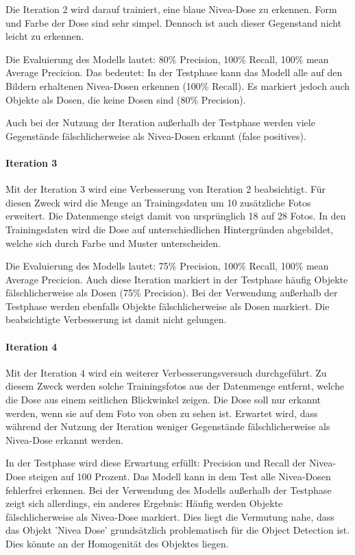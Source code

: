Die Iteration 2 wird darauf trainiert, eine blaue Nivea-Dose zu erkennen. Form und Farbe der Dose sind sehr simpel. Dennoch ist auch dieser Gegenstand nicht leicht zu erkennen. 

Die Evaluierung des Modells lautet: 80\% Precision, 100\% Recall, 100\% mean Average Precicion.
Das bedeutet: In der Testphase kann das Modell alle auf den Bildern erhaltenen Nivea-Dosen erkennen (100\% Recall). Es markiert jedoch auch Objekte als Dosen, die keine Dosen sind (80\% Precision).

Auch bei der Nutzung der Iteration außerhalb der Testphase werden viele Gegenstände fälschlicherweise als Nivea-Dosen erkannt (false positives). 


\paragraph{Iteration 3}

Mit der Iteration 3 wird eine Verbesserung von Iteration 2 beabsichtigt. Für diesen Zweck wird die Menge an Trainingsdaten um 10 zusätzliche Fotos erweitert. Die Datenmenge steigt damit von ursprünglich 18 auf 28 Fotos. In den Trainingsdaten wird die Dose auf unterschiedlichen Hintergründen abgebildet, welche sich durch Farbe und Muster unterscheiden. 

Die Evaluierung des Modells lautet: 75\% Precision, 100\% Recall, 100\% mean Average Precicion. Auch diese Iteration markiert in der Testphase häufig Objekte fälschlicherweise als Dosen (75\% Precision). Bei der Verwendung außerhalb der Testphase werden ebenfalls Objekte fälschlicherweise als Dosen markiert. Die beabsichtigte Verbesserung ist damit nicht gelungen.

\paragraph{Iteration 4}

Mit der Iteration 4 wird ein weiterer Verbesserungsversuch durchgeführt. Zu diesem Zweck werden solche Trainingsfotos aus der Datenmenge entfernt, welche die Dose aus einem seitlichen Blickwinkel zeigen. Die Dose soll nur erkannt werden, wenn sie auf dem Foto von oben zu sehen ist. Erwartet wird, dass während der Nutzung der Iteration weniger Gegenstände fälschlicherweise als Nivea-Dose erkannt werden.

In der Testphase wird diese Erwartung erfüllt: Precision und Recall der Nivea-Dose steigen auf 100 Prozent. Das Modell kann in dem Test alle Nivea-Dosen fehlerfrei erkennen. Bei der Verwendung des Modells außerhalb der Testphase zeigt sich allerdings, ein anderes Ergebnis: Häufig werden Objekte fälschlicherweise als Nivea-Dose markiert. Dies liegt die Vermutung nahe, dass das Objekt 'Nivea Dose' grundsätzlich problematisch für die Object Detection ist. Dies könnte an der Homogenität des Objektes liegen. 

